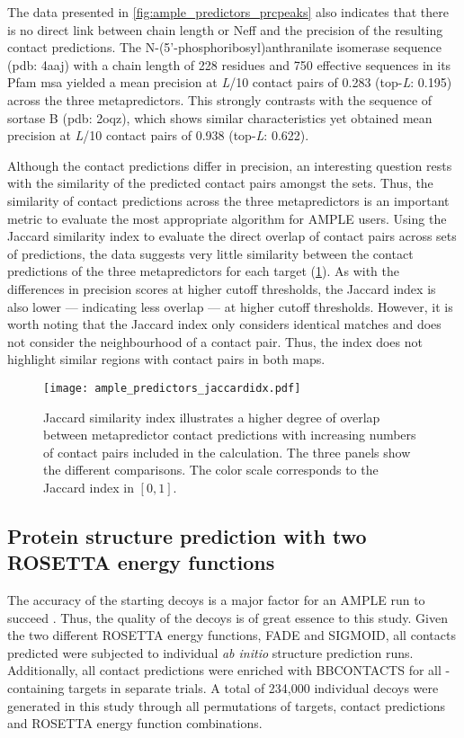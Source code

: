 The data presented in \cref{fig:ample_predictors_prcpeaks} also indicates that there is no direct link between chain length or Neff and the precision of the resulting contact predictions. The N-(5'-phosphoribosyl)anthranilate isomerase sequence (\gls{pdb}: 4aaj) with a chain length of 228 residues and 750 effective sequences in its Pfam \gls{msa} yielded a mean precision at \textit{L}/10 contact pairs of 0.283 (top-\textit{L}: 0.195) across the three metapredictors. This strongly contrasts with the sequence of sortase B (\gls{pdb}: 2oqz), which shows similar characteristics yet obtained  mean precision at \textit{L}/10 contact pairs of 0.938 (top-\textit{L}: 0.622).

Although the contact predictions differ in precision, an interesting question rests with the similarity of the predicted contact pairs amongst the sets. Thus, the similarity of contact predictions across the three metapredictors is an important metric to evaluate the most appropriate algorithm for AMPLE users. Using the Jaccard similarity index to evaluate the direct overlap of contact pairs across sets of predictions, the data suggests very little similarity between the contact predictions of the three metapredictors for each target (\cref{fig:ample_predictors_jaccardidx}). As with the differences in precision scores at higher cutoff thresholds, the Jaccard index is also lower --- indicating less overlap --- at higher cutoff thresholds. However, it is worth noting that the Jaccard index only considers identical matches and does not consider the neighbourhood of a contact pair. Thus, the index does not highlight similar regions with contact pairs in both maps.

\begin{figure}[H]
    \centering
    \texttt{[image: ample\_predictors\_jaccardidx.pdf]}
    \caption{Jaccard similarity index illustrates a higher degree of overlap between metapredictor contact predictions with increasing numbers of contact pairs included in the calculation. The three panels show the different comparisons. The color scale corresponds to the Jaccard index in $[0, 1]$.}
    \label{fig:ample_predictors_jaccardidx}
\end{figure}

\subsection{Protein structure prediction with two ROSETTA energy functions}
The accuracy of the starting decoys is a major factor for an AMPLE run to succeed \cite{Thomas2017-sh}. Thus, the quality of the decoys is of great essence to this study. Given the two different ROSETTA energy functions, FADE and SIGMOID, all contacts predicted were subjected to individual \textit{ab initio} structure prediction runs. Additionally, all contact predictions were enriched with BBCONTACTS for all \textbeta-containing targets in separate trials. A total of 234,000 individual decoys were generated in this study through all permutations of targets, contact predictions and ROSETTA energy function combinations.

